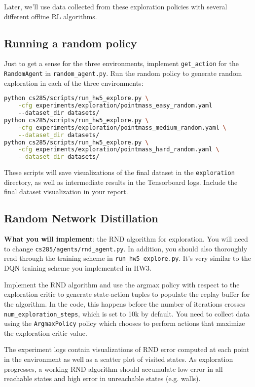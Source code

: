 \documentclass{article}
\begin{document}
Later, we'll use data collected from these exploration policies with several different offline RL algorithms.

\subsection{Running a random policy}
Just to get a sense for the three environments, implement \verb+get_action+ for the \verb+RandomAgent+ in \verb+random_agent.py+. Run the random policy to generate random exploration in each of the three environments:
\begin{lstlisting}[language=bash]
python cs285/scripts/run_hw5_explore.py \
    -cfg experiments/exploration/pointmass_easy_random.yaml
    --dataset_dir datasets/
python cs285/scripts/run_hw5_explore.py \
    -cfg experiments/exploration/pointmass_medium_random.yaml \
    --dataset_dir datasets/
python cs285/scripts/run_hw5_explore.py \
    -cfg experiments/exploration/pointmass_hard_random.yaml \
    --dataset_dir datasets/
\end{lstlisting}
These scripts will save visualizations of the final dataset in the \verb+exploration+ directory, as well as intermediate results in the Tensorboard logs. Include the final dataset visualization in your report.

\subsection{Random Network Distillation}
\textbf{What you will implement}: the RND algorithm for exploration. You will need to change \verb+cs285/agents/rnd_agent.py+. In addition, you should also thoroughly read through the training scheme in \verb+run_hw5_explore.py+. It's very similar to the DQN training scheme you implemented in HW3.

Implement the RND algorithm and use the argmax policy with respect to the exploration critic to generate state-action tuples to populate the replay buffer for the algorithm. In the code, this happens before the number of iterations crosses \verb+num_exploration_steps+, which is set to 10k by default. You need to collect data using the \verb+ArgmaxPolicy+ policy which chooses to perform actions that maximize the exploration critic value.

The experiment logs contain visualizations of RND error computed at each point in the environment as well as a scatter plot of visited states. As exploration progresses, a working RND algorithm should accumulate low error in all reachable states and high error in unreachable states (e.g. walls).
\end{document}
